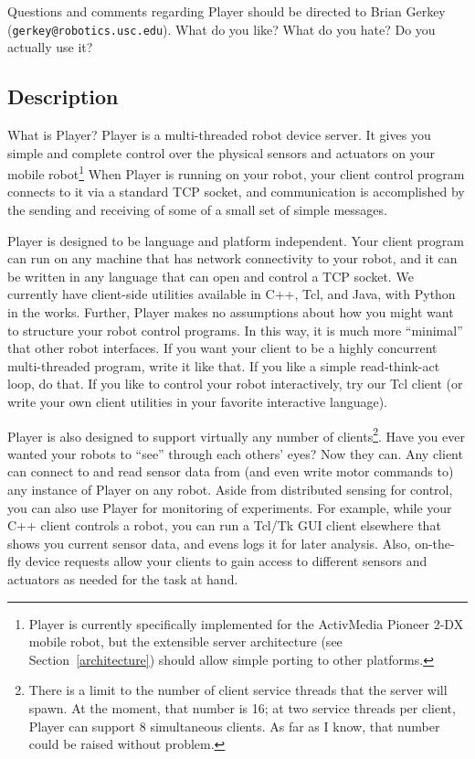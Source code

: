 \documentclass[11pt]{article}
\begin{document}
Questions and comments regarding Player should be directed to
Brian Gerkey ({\tt gerkey@robotics.usc.edu}).  What do you like? What do you
hate?  Do you actually use it?

\subsection{Description}
What is Player? Player is a multi-threaded robot device server.  It gives
you simple and complete control over the physical sensors and actuators
on your mobile robot\footnote{Player is currently specifically implemented
for the ActivMedia Pioneer 2-DX mobile robot, but the extensible server
architecture (see Section~\ref{architecture}) should allow simple
porting to other platforms.}
When Player is running on your robot, your client control program connects
to it via a standard TCP socket, and communication is accomplished
by the sending and receiving of some of a small set of simple messages.

Player is designed to be language and platform independent.  Your client
program can run on any machine that has network connectivity to your
robot, and it can be written in any language that can open and control a 
TCP socket.  We currently have client-side utilities available in
C++, Tcl, and Java, with Python in the works.  Further, Player makes no 
assumptions about how you might want to structure your robot control 
programs.  In
this way, it is much more ``minimal'' that other robot interfaces.  If
you want your client to be a highly concurrent multi-threaded program,
write it like that.  If you like a simple read-think-act loop, do that.
If you like to control your robot interactively, try our Tcl client
(or write your own client utilities in your favorite interactive 
language).

Player is also designed to support virtually any number of 
clients\footnote{There is a limit to the number of client service
threads that the server will spawn.  At the moment, that number
is 16; at two service threads per client, Player can support 8 simultaneous
clients.  As far as I know, that number could be raised without
problem.}.
Have
you ever wanted your robots to ``see'' through each others' eyes?  Now
they can.  Any client can connect to and read sensor data from (and
even write motor commands to) any instance
of Player on any robot.  Aside from distributed sensing for control, you
can also use Player for monitoring of experiments.  For example,
while your C++ client controls a robot, you can run a Tcl/Tk GUI client
elsewhere that shows you current sensor data, and evens logs it for
later analysis.  Also, on-the-fly device requests allow your clients to gain 
access to different sensors and actuators as needed for the task at hand.
\end{document}
